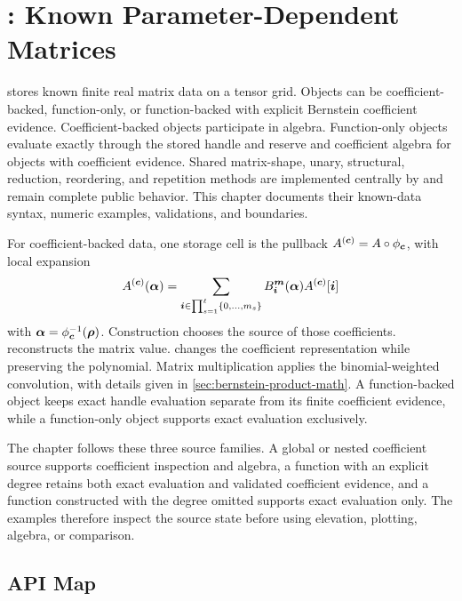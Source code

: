 \chapter{\texorpdfstring{}{pdmat}: Known Parameter-Dependent Matrices}
\label{sec:pdmat}

 stores known finite real matrix data on a tensor grid. Objects can be coefficient-backed, function-only, or function-backed with explicit Bernstein coefficient evidence. Coefficient-backed objects participate in algebra. Function-only objects evaluate exactly through the stored handle and reserve  and coefficient algebra for objects with coefficient evidence. Shared matrix-shape, unary, structural, reduction, reordering, and repetition methods are implemented centrally by  and remain complete public  behavior. This chapter documents their known-data syntax, numeric examples, validations, and boundaries.

For coefficient-backed data, one storage cell is the pullback $A^{(\boldsymbol{c})}=A\circ\phi_{\boldsymbol{c}}$, with local expansion
\begin{gather}
    \label{eq:bernstein-coeffs}
    A^{(\boldsymbol{c})}(\boldsymbol{\alpha})=\displaystyle\sum_{\boldsymbol{i}\in\prod_{s=1}^{\ell}\{0,\ldots,m_s\}}B_{\boldsymbol{i}}^{\boldsymbol{m}}(\boldsymbol{\alpha})A^{(\boldsymbol{c})}[\boldsymbol{i}]
\end{gather}
with $\boldsymbol{\alpha}=\phi_{\boldsymbol{c}}^{-1}(\boldsymbol{\rho})$. Construction chooses the source of those coefficients.  reconstructs the matrix value.  changes the coefficient representation while preserving the polynomial. Matrix multiplication applies the binomial-weighted convolution, with details given in \cref{sec:bernstein-product-math}. A function-backed object keeps exact handle evaluation separate from its finite coefficient evidence, while a function-only object supports exact evaluation exclusively.

The chapter follows these three source families. A global or nested coefficient source supports coefficient inspection and algebra, a function with an explicit degree retains both exact evaluation and validated coefficient evidence, and a function constructed with the degree omitted supports exact evaluation only. The examples therefore inspect the source state before using elevation, plotting, algebra, or comparison.

\section{API Map}
\label{sec:pdmat-lookup}

